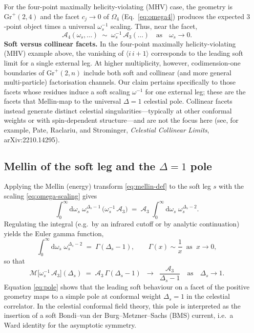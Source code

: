 \documentclass[11pt]{article}
\begin{document}
For the four-point maximally helicity-violating (MHV) case, the geometry is \(\mathrm{Gr}^+(2,4)\) and the facet \(c_j\to0\) of \(\Omega_4\) (Eq.~\eqref{eq:omega4}) produces the expected \(3\)-point object times a universal \(\omega_s^{-1}\) scaling. Thus, near the facet,
\begin{equation}
\mathcal{A}_{4}(\omega_s,\dots)
\;\sim\;
\omega_s^{-1}\,\mathcal{A}_{3}(\dots)
\quad\text{as}\quad \omega_s\to0.
\label{eq:omega-scaling}
\end{equation}
\noindent\textbf{Soft versus collinear facets.}
In the four-point maximally helicity-violating (MHV) example above, the vanishing of
\(\langle i\,i{+}1\rangle\) corresponds to the leading soft limit for a single external leg.
At higher multiplicity, however, codimension-one boundaries of
\(\mathrm{Gr}^{+}(2,n)\) include both soft and collinear (and more general multi-particle)
factorisation channels.
Our claim pertains specifically to those facets whose residues induce a
soft scaling \( \omega^{-1} \) for one external leg; these are the facets that
Mellin-map to the universal \( \Delta = 1 \) celestial pole.
Collinear facets instead generate distinct celestial singularities—typically at other
conformal weights or with spin-dependent structure—and are not the focus here
(see, for example, Pate, Raclariu, and Strominger, \emph{Celestial Collinear Limits},
arXiv:2210.14295).

\subsection{Mellin of the soft leg and the \texorpdfstring{$\Delta=1$}{Delta=1} pole}
Applying the Mellin (energy) transform \eqref{eq:mellin-def} to the soft leg \(s\) with the scaling \eqref{eq:omega-scaling} gives
\begin{equation}
\int_{0}^{\infty}\!\mathrm{d}\omega_s\;
\omega_s^{\Delta_s-1}\,\big(\omega_s^{-1}\,\mathcal{A}_{3}\big)
\;=\;
\mathcal{A}_{3}\;\int_{0}^{\infty}\!\mathrm{d}\omega_s\;\omega_s^{\Delta_s-2}.
\label{eq:mellin-soft-setup}
\end{equation}
Regulating the integral (e.g.\ by an infrared cutoff or by analytic continuation) yields the Euler gamma function,
\begin{equation}
\int_{0}^{\infty}\!\mathrm{d}\omega_s\;\omega_s^{\Delta_s-2}
\;=\;
\Gamma(\Delta_s-1),
\qquad
\Gamma(x)\sim\frac{1}{x}\;\;\text{as}\;\;x\to0,
\label{eq:gamma}
\end{equation}
so that
\begin{equation}
\mathcal{M}\big[\omega_s^{-1}\,\mathcal{A}_{3}\big](\Delta_s)
\;=\;
\mathcal{A}_{3}\,\Gamma(\Delta_s-1)
\;\;\longrightarrow\;\;
\frac{\mathcal{A}_{3}}{\Delta_s-1}
\quad\text{as}\quad \Delta_s\to1.
\label{eq:pole}
\end{equation}
Equation \eqref{eq:pole} shows that the leading soft behaviour on a facet of the positive geometry maps to a simple pole at conformal weight \(\Delta_s=1\) in the celestial correlator. In the celestial conformal field theory, this pole is interpreted as the insertion of a soft Bondi--van der Burg--Metzner--Sachs (BMS) current, i.e.\ a Ward identity for the asymptotic symmetry.
\end{document}
